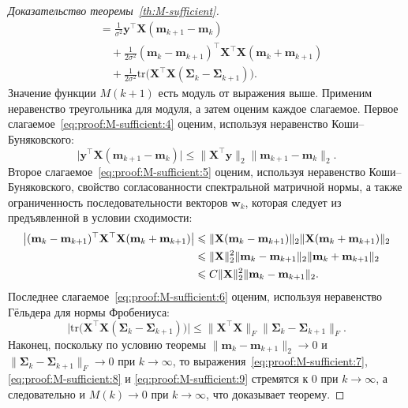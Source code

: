 \begin{proof}[Доказательство теоремы~\ref{th:M-sufficient}]
\begin{align}
        &= \frac{1}{\sigma^2} \mathbf{y}^{\top} \mathbf{X} (\mathbf{m}_{k+1} - \mathbf{m}_k) \label{eq:proof:M-sufficient:4} \\
        &\quad + \frac{1}{2\sigma^2} (\mathbf{m}_k - \mathbf{m}_{k+1})^{\top} \mathbf{X}^{\top}\mathbf{X} (\mathbf{m}_k + \mathbf{m}_{k+1}) \label{eq:proof:M-sufficient:5} \\
        &\quad + \frac{1}{2\sigma^2} \text{tr} \Big( \mathbf{X}^{\top}\mathbf{X} \left( \mathbf{\Sigma}_k - \mathbf{\Sigma}_{k+1} \right) \Big). \label{eq:proof:M-sufficient:6}
    \end{align}
    Значение функции $M(k+1)$ есть модуль от выражения выше. Применим неравенство треугольника для модуля, а затем оценим каждое слагаемое. Первое слагаемое~\eqref{eq:proof:M-sufficient:4} оценим, используя неравенство Коши--Буняковского:
    \begin{equation}
        \big| \mathbf{y}^{\top}\mathbf{X}(\mathbf{m}_{k+1}-\mathbf{m}_k)\big| \leqslant \| \mathbf{X}^{\top}\mathbf{y} \|_2 \|\mathbf{m}_{k+1} - \mathbf{m}_k\|_2. \label{eq:proof:M-sufficient:7}
    \end{equation}
    Второе слагаемое~\eqref{eq:proof:M-sufficient:5} оценим, используя неравенство Коши--Буняковского, свойство согласованности спектральной матричной нормы, а также ограниченность последовательности векторов $\mathbf{w}_k$, которая следует из предъявленной в условии сходимости:
    \begin{align}
        \big| (\mathbf{m}_k - \mathbf{m}_{k+1})^{\top} \mathbf{X}^{\top}\mathbf{X} (\mathbf{m}_k + \mathbf{m}_{k+1}) \big| &\leqslant \| \mathbf{X} (\mathbf{m}_k - \mathbf{m}_{k+1}) \|_2 \| \mathbf{X} (\mathbf{m}_k + \mathbf{m}_{k+1}) \|_2 \notag \\
        &\leqslant \| \mathbf{X} \|_2^2 \| \mathbf{m}_k - \mathbf{m}_{k+1} \|_2 \| \mathbf{m}_k + \mathbf{m}_{k+1} \|_2 \notag \\
        &\leqslant C \| \mathbf{X} \|_2^2 \| \mathbf{m}_k - \mathbf{m}_{k+1} \|_2. \label{eq:proof:M-sufficient:8}
    \end{align}
    Последнее слагаемое~\eqref{eq:proof:M-sufficient:6} оценим, используя неравенство Гёльдера для нормы Фробениуса:
    \begin{equation}
        \Big| \text{tr} \Big( \mathbf{X}^{\top}\mathbf{X} \left( \mathbf{\Sigma}_k - \mathbf{\Sigma}_{k+1} \right) \Big) \Big| \leqslant \| \mathbf{X}^{\top}\mathbf{X} \|_F \| \mathbf{\Sigma}_k - \mathbf{\Sigma}_{k+1} \|_F. \label{eq:proof:M-sufficient:9}
    \end{equation}
    Наконец, поскольку по условию теоремы $\| \mathbf{m}_k - \mathbf{m}_{k+1} \|_2 \to 0$ и $\| \boldsymbol{\Sigma}_k - \boldsymbol{\Sigma}_{k+1} \|_{F} \to 0$ при $k \to \infty$, то выражения~\eqref{eq:proof:M-sufficient:7}, \eqref{eq:proof:M-sufficient:8} и \eqref{eq:proof:M-sufficient:9} стремятся к 0 при $k \to \infty$, а следовательно и $M(k) \to 0$ при $k \to \infty$, что доказывает теорему.
\end{proof}

